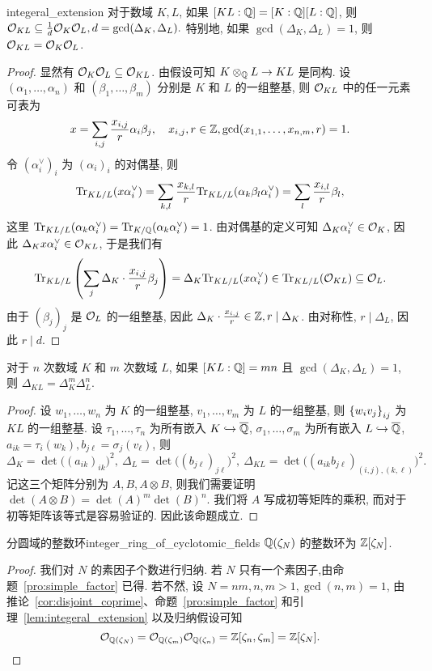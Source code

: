 \begin{lemma}{}{integeral_extension}
对于数域 $K, L$, 如果 $[KL:{\mathbb{Q}}]=[K:{\mathbb{Q}}][L:{\mathbb{Q}}]$, 则 ${\mathcal{O}}_{KL}\subseteq \frac{1}{d}{\mathcal{O}}_K{\mathcal{O}}_L, d=\gcd(\Delta_K,\Delta_L).$ 特别地, 如果 $\gcd(\Delta_K,\Delta_L)=1$, 则 ${\mathcal{O}}_{KL}={\mathcal{O}}_K{\mathcal{O}}_L$.
\end{lemma}
\begin{proof}
显然有 ${\mathcal{O}}_K{\mathcal{O}}_L\subseteq {\mathcal{O}}_{KL}$.
由假设可知 $K\otimes_{\mathbb{Q}} L\to KL$ 是同构. 设 $(\alpha_1,\dots,\alpha_n)$ 和 $(\beta_1,\dots,\beta_m)$ 分别是 $K$ 和 $L$ 的一组整基, 则 ${\mathcal{O}}_{KL}$ 中的任一元素可表为
  \[x=\sum_{i,j}\frac{x_{i,j}}{r}\alpha_i\beta_j,\quad x_{i,j},r\in{\mathbb{Z}}, \gcd(x_{1,1},\dots,x_{n,m},r)=1.\]
令 $(\alpha_i^\vee)_i$ 为 $(\alpha_i)_i$ 的对偶基, 则
  \[{\mathrm{Tr}}_{KL/L}(x\alpha_i^\vee)=\sum_{k,l}\frac{x_{k,l}}{r}{\mathrm{Tr}}_{KL/L}(\alpha_k\beta_l\alpha_i^\vee)
    =\sum_l \frac{x_{i,l}}{r}\beta_l,\]
这里 ${\mathrm{Tr}}_{KL/L}(\alpha_k\alpha_i^\vee)={\mathrm{Tr}}_{K/{\mathbb{Q}}}(\alpha_k\alpha_i^\vee)=1$.
由对偶基的定义可知 $\Delta_K\alpha_i^\vee\in{\mathcal{O}}_K$, 因此 $\Delta_Kx\alpha_i^\vee\in{\mathcal{O}}_{KL}$, 于是我们有
  \[{\mathrm{Tr}}_{KL/L}\left(\sum_j\Delta_K\cdot \frac{x_{i,j}}{r}\beta_j\right)=\Delta_K{\mathrm{Tr}}_{KL/L}(x\alpha_i^\vee)\in{\mathrm{Tr}}_{KL/L}({\mathcal{O}}_{KL})\subseteq{\mathcal{O}}_L.\]
由于 $(\beta_j)_j$ 是 ${\mathcal{O}}_L$ 的一组整基, 因此 $\Delta_K\cdot \frac{x_{i,j}}{r}\in{\mathbb{Z}}, r\mid \Delta_K$. 由对称性, $r\mid \Delta_L$, 因此 $r\mid d$.
\end{proof}

\begin{corollary}{}{}
对于 $n$ 次数域 $K$ 和 $m$ 次数域 $L$, 如果 $[KL:{\mathbb{Q}}]=mn$ 且 $\gcd(\Delta_K,\Delta_L)=1$, 则 $\Delta_{KL}=\Delta_K^m\Delta_L^n$.
\end{corollary}
\begin{proof}
设 $w_1,\dots,w_n$ 为 $K$ 的一组整基, $v_1,\dots,v_m$ 为 $L$ 的一组整基, 则 $\left\{w_iv_j\right\}_{ij}$ 为 $KL$ 的一组整基. 设 $\tau_1,\dots,\tau_n$ 为所有嵌入 $K\hookrightarrow\overline{{\mathbb{Q}}}$, $\sigma_1,\dots,\sigma_m$ 为所有嵌入 $L\hookrightarrow\overline{{\mathbb{Q}}}$, $a_{ik}=\tau_i(w_k),b_{j\ell}=\sigma_j(v_\ell)$, 则
	\[\Delta_K=\det\bigl((a_{ik})_{ik}\bigr)^2,\ 
		\Delta_L=\det\bigl((b_{j\ell})_{j\ell}\bigr)^2,\ 
		\Delta_{KL}=\det\bigl((a_{ik}b_{j\ell})_{(i,j),(k,\ell)}\bigr)^2.\]
记这三个矩阵分别为 $A,B,A\otimes B$, 则我们需要证明 $\det(A\otimes B)=\det(A)^m\det(B)^n$. 我们将 $A$ 写成初等矩阵的乘积, 而对于初等矩阵该等式是容易验证的. 因此该命题成立.
\end{proof}



\begin{theorem}{分圆域的整数环}{integer_ring_of_cyclotomic_fields}
${\mathbb{Q}}(\zeta_N)$ 的整数环为 ${\mathbb{Z}}[\zeta_N]$.
\end{theorem}
\begin{proof}
我们对 $N$ 的素因子个数进行归纳. 若 $N$ 只有一个素因子,由命题~\ref{pro:simple_factor} 已得. 若不然, 设 $N=nm,n,m>1,\gcd(n,m)=1$, 由推论~\ref{cor:disjoint_coprime}、命题~\ref{pro:simple_factor} 和引理~\ref{lem:integeral_extension} 以及归纳假设可知
\[{\mathcal{O}}_{{\mathbb{Q}}(\zeta_N)}={\mathcal{O}}_{{\mathbb{Q}}(\zeta_m)}{\mathcal{O}}_{{\mathbb{Q}}(\zeta_n)}={\mathbb{Z}}[\zeta_n,\zeta_m]={\mathbb{Z}}[\zeta_N].\]
\end{proof}

